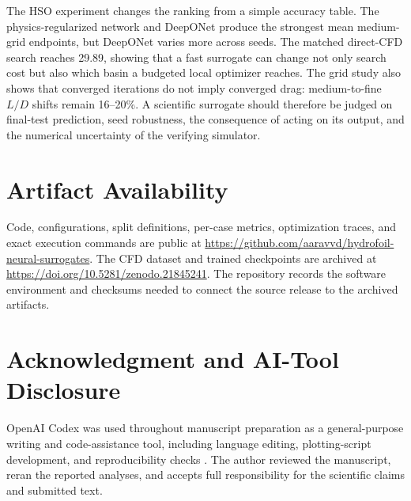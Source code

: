 \documentclass[conference]{IEEEtran}
\begin{document}
The HSO experiment changes the ranking from a simple accuracy table. The
physics-regularized network and DeepONet produce the strongest mean medium-grid
endpoints, but DeepONet varies more across seeds. The matched direct-CFD search
reaches 29.89, showing that a fast surrogate can change not only search
cost but also which basin a budgeted local optimizer reaches. The grid study
also shows that converged iterations do not imply converged drag: medium-to-fine
$L/D$ shifts remain 16--20\%. A scientific surrogate should therefore be judged
on final-test prediction, seed robustness, the consequence of acting on its
output, and the numerical uncertainty of the verifying simulator.

\section*{Artifact Availability}
Code, configurations, split definitions, per-case metrics, optimization traces,
and exact execution commands are public at
\url{https://github.com/aaravvd/hydrofoil-neural-surrogates}. The CFD dataset
and trained checkpoints are archived at
\url{https://doi.org/10.5281/zenodo.21845241}. The repository records the
software environment and checksums needed to connect the source release to the
archived artifacts.

\section*{Acknowledgment and AI-Tool Disclosure}
OpenAI Codex was used throughout manuscript preparation as a general-purpose
writing and code-assistance tool, including language editing, plotting-script
development, and reproducibility checks \cite{openai2026codex}. The author
reviewed the manuscript, reran the reported analyses, and accepts full
responsibility for the scientific claims and submitted text.



\end{document}
